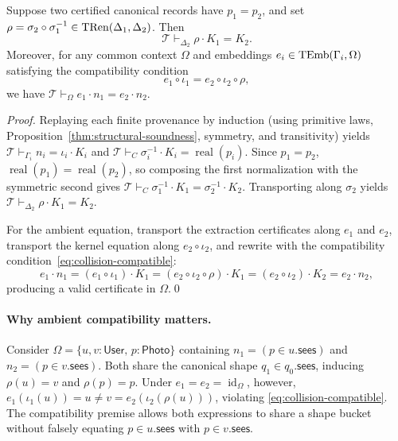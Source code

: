 \begin{proposition}
\label{thm:collision-soundness}
Suppose two certified canonical records have $p_1=p_2$, and set
$\rho=\sigma_2\circ\sigma_1^{-1}\in\operatorname{TRen}(\Delta_1,\Delta_2)$. Then
\[
 \mathcal T\vdash_{\Delta_2} \rho\cdot K_1 = K_2.
\]
Moreover, for any common context $\Omega$ and embeddings
$e_i\in\operatorname{TEmb}(\Gamma_i,\Omega)$ satisfying the compatibility condition
\begin{equation}
 e_1\circ\iota_1 = e_2\circ\iota_2\circ\rho,
 \label{eq:collision-compatible}
\end{equation}
we have $\mathcal T\vdash_\Omega e_1\cdot n_1 = e_2\cdot n_2$.
\end{proposition}
\begin{proof}
Replaying each finite provenance by induction (using primitive laws,
Proposition~\ref{thm:structural-soundness}, symmetry, and transitivity) yields
$\mathcal T\vdash_{\Gamma_i} n_i=\iota_i\cdot K_i$ and
$\mathcal T\vdash_C \sigma_i^{-1}\cdot K_i=\operatorname{real}(p_i)$. Since
$p_1=p_2$, $\operatorname{real}(p_1)=\operatorname{real}(p_2)$, so composing
the first normalization with the symmetric second gives
$\mathcal T\vdash_C \sigma_1^{-1}\cdot K_1=\sigma_2^{-1}\cdot K_2$.
Transporting along $\sigma_2$ yields $\mathcal T\vdash_{\Delta_2}\rho\cdot K_1=K_2$.

For the ambient equation, transport the extraction certificates along $e_1$ and
$e_2$, transport the kernel equation along $e_2\circ\iota_2$, and rewrite with
the compatibility condition~\eqref{eq:collision-compatible}:
\[
 e_1\cdot n_1
 =(e_1\circ\iota_1)\cdot K_1
 =(e_2\circ\iota_2\circ\rho)\cdot K_1
 =(e_2\circ\iota_2)\cdot K_2
 =e_2\cdot n_2,
\]
producing a valid certificate in $\Omega$.\qed
\end{proof}

\paragraph{Why ambient compatibility matters.}
Consider $\Omega=\{u,v:\mathsf{User},\,p:\mathsf{Photo}\}$ containing
$n_1=(p\in u.\mathsf{sees})$ and $n_2=(p\in v.\mathsf{sees})$. Both share the
canonical shape $q_1\in q_0.\mathsf{sees}$, inducing $\rho(u)=v$ and
$\rho(p)=p$. Under $e_1=e_2=\operatorname{id}_\Omega$, however,
$e_1(\iota_1(u))=u\neq v=e_2(\iota_2(\rho(u)))$, violating
\eqref{eq:collision-compatible}. The compatibility premise allows both
expressions to share a shape bucket without falsely equating $p\in u.\mathsf{sees}$
with $p\in v.\mathsf{sees}$.

